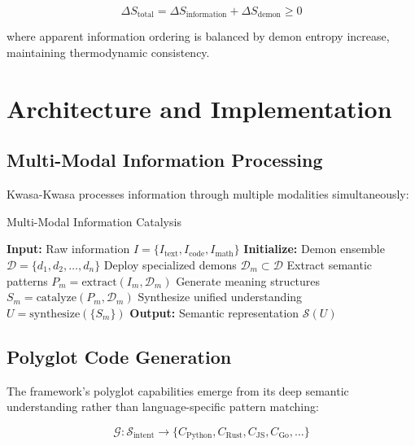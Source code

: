 \documentclass[12pt,a4paper]{article}
\begin{document}
\begin{equation}
\Delta S_{\text{total}} = \Delta S_{\text{information}} + \Delta S_{\text{demon}} \geq 0
\end{equation}

where apparent information ordering is balanced by demon entropy increase, maintaining thermodynamic consistency.

\section{Architecture and Implementation}

\subsection{Multi-Modal Information Processing}

Kwasa-Kwasa processes information through multiple modalities simultaneously:

\begin{algorithm}
\caption{Multi-Modal Information Catalysis}
\begin{algorithmic}[1]
\STATE \textbf{Input:} Raw information $I = \{I_{\text{text}}, I_{\text{code}}, I_{\text{math}}\}$
\STATE \textbf{Initialize:} Demon ensemble $\mathcal{D} = \{d_1, d_2, \ldots, d_n\}$
    \STATE Deploy specialized demons $\mathcal{D}_m \subset \mathcal{D}$
    \STATE Extract semantic patterns $P_m = \text{extract}(I_m, \mathcal{D}_m)$
    \STATE Generate meaning structures $S_m = \text{catalyze}(P_m, \mathcal{D}_m)$
\ENDFOR
\STATE Synthesize unified understanding $U = \text{synthesize}(\{S_m\})$
\STATE \textbf{Output:} Semantic representation $\mathcal{S}(U)$
\end{algorithmic}
\end{algorithm}

\subsection{Polyglot Code Generation}

The framework's polyglot capabilities emerge from its deep semantic understanding rather than language-specific pattern matching:

\begin{equation}
\mathcal{G}: \mathcal{S}_{\text{intent}} \rightarrow \{C_{\text{Python}}, C_{\text{Rust}}, C_{\text{JS}}, C_{\text{Go}}, \ldots\}
\end{equation}
\end{document}
